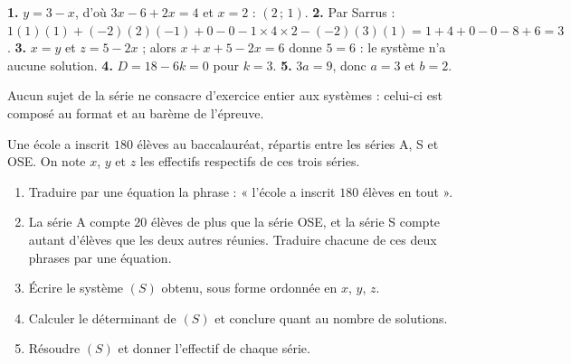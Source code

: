 \begin{corrige}[je me teste]
\textbf{1.} $y = 3-x$, d'où $3x-6+2x = 4$ et $x = 2$ : $(2\,;\,1)$.
\textbf{2.} Par Sarrus : $1(1)(1)+(-2)(2)(-1)+0-0-1\times4\times2
-(-2)(3)(1) = 1+4+0-0-8+6 = 3$.
\textbf{3.} $x = y$ et $z = 5-2x$ ; alors $x+x+5-2x = 6$ donne $5 = 6$ :
le système n'a aucune solution.
\textbf{4.} $D = 18-6k = 0$ pour $k = 3$.
\textbf{5.} $3a = 9$, donc $a = 3$ et $b = 2$.
\end{corrige}

\begin{commeaubac}
Aucun sujet de la série ne consacre d'exercice entier aux systèmes : celui-ci
est composé au format et au barème de l'épreuve.

Une école a inscrit $180$ élèves au baccalauréat, répartis entre les séries
A, S et OSE. On note $x$, $y$ et $z$ les effectifs respectifs de ces trois
séries.

\begin{enumerate}[label=\textbf{\arabic*.}, leftmargin=*, itemsep=0.28em]
  \item Traduire par une équation la phrase : « l'école a inscrit $180$
        élèves en tout ». 
  \item La série A compte $20$ élèves de plus que la série OSE, et la série S
        compte autant d'élèves que les deux autres réunies. Traduire chacune
        de ces deux phrases par une équation. \bareme{1 pt}
  \item Écrire le système $(S)$ obtenu, sous forme ordonnée en $x$, $y$, $z$.
  \item Calculer le déterminant de $(S)$ et conclure quant au nombre de
        solutions. 
  \item Résoudre $(S)$ et donner l'effectif de chaque série. 
\end{enumerate}
\end{commeaubac}

